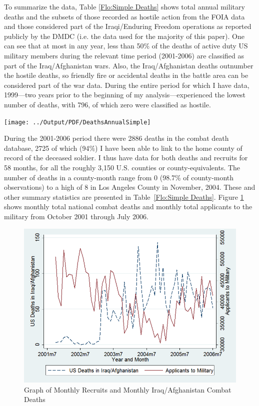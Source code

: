 \documentclass[12pt] {article}
\begin{document}
To summarize the data, Table \ref{Flo:Simple Deaths} shows total annual military deaths and the subsets of those recorded as hostile action from the FOIA data and those considered part of the Iraqi/Enduring Freedom operations as reported publicly by the DMDC (i.e. the data used for the majority of this paper). One can see that at most in any year, less than 50\% of the deaths of active duty US military members during the relevant time period (2001-2006) are classified as part of the Iraq/Afghanistan wars. Also, the Iraq/Afghanistan deaths outnumber the hostile deaths, so friendly fire or accidental deaths in the battle area can be considered part of the war data. During the entire period for which I have data, 1999---two years prior to the beginning of my analysis---experienced the lowest number of deaths, with 796, of which zero were classified as hostile. 

\begin{table}
\caption{}
\label{Flo:Simple Deaths}\texttt{[image: ../Output/PDF/DeathsAnnualSimple]}
\end{table}


During the 2001-2006 period there were 2886 deaths in the combat death database, 2725 of which (94\%) I have been able to link to the home county of record of the deceased soldier. I thus have data for both deaths and recruits for 58 months, for all the roughly 3,150 U.S. counties or county-equivalents. The number of deaths in a county-month range from 0 (98.7\% of county-month observations) to a high of 8 in Los Angeles County in November, 2004. These and other summary statistics are presented in Table~\ref{Flo:Simple Deaths}. Figure \ref{Flo:Monthly Deaths vs. Monthly Recruits} shows monthly total national combat deaths and monthly total applicants to the military from October 2001 through July 2006. 

\begin{figure}
\includegraphics[scale=0.6]{../Output/graph_deathsvsrecruits_basic}
\caption{Graph of Monthly Recruits and Monthly Iraq/Afghanistan Combat Deaths}
\label{Flo:Monthly Deaths vs. Monthly Recruits}
\end{figure} 
 
\end{document}
